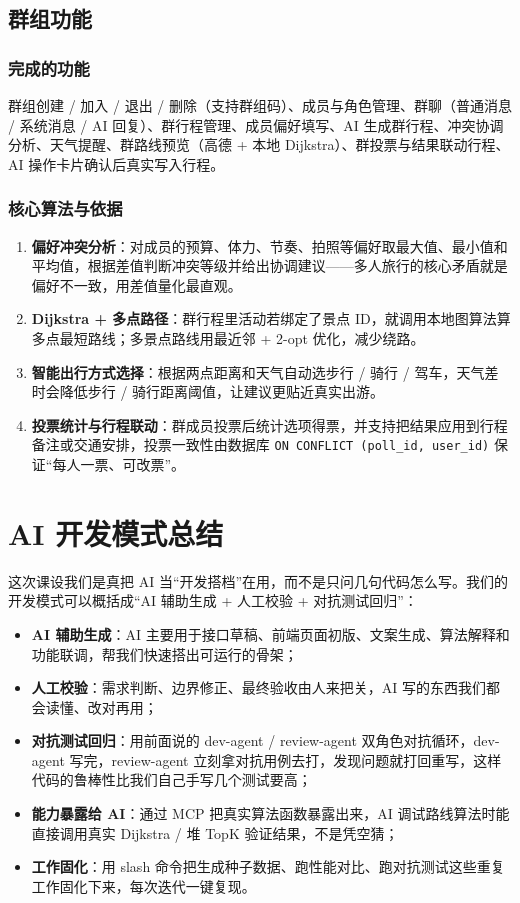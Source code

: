 \documentclass[UTF8,a4paper,12pt]{ctexart}
\begin{document}
\subsection{群组功能}

\subsubsection{完成的功能}
群组创建 / 加入 / 退出 / 删除（支持群组码）、成员与角色管理、群聊（普通消息 / 系统消息 / AI 回复）、群行程管理、成员偏好填写、AI 生成群行程、冲突协调分析、天气提醒、群路线预览（高德 + 本地 Dijkstra）、群投票与结果联动行程、AI 操作卡片确认后真实写入行程。

\subsubsection{核心算法与依据}
\begin{enumerate}
\item \textbf{偏好冲突分析}：对成员的预算、体力、节奏、拍照等偏好取最大值、最小值和平均值，根据差值判断冲突等级并给出协调建议——多人旅行的核心矛盾就是偏好不一致，用差值量化最直观。
\item \textbf{Dijkstra + 多点路径}：群行程里活动若绑定了景点 ID，就调用本地图算法算多点最短路线；多景点路线用最近邻 + 2-opt 优化，减少绕路。
\item \textbf{智能出行方式选择}：根据两点距离和天气自动选步行 / 骑行 / 驾车，天气差时会降低步行 / 骑行距离阈值，让建议更贴近真实出游。
\item \textbf{投票统计与行程联动}：群成员投票后统计选项得票，并支持把结果应用到行程备注或交通安排，投票一致性由数据库 \texttt{ON CONFLICT (poll\_id, user\_id)} 保证“每人一票、可改票”。
\end{enumerate}

\section{AI 开发模式总结}

这次课设我们是真把 AI 当“开发搭档”在用，而不是只问几句代码怎么写。我们的开发模式可以概括成“AI 辅助生成 + 人工校验 + 对抗测试回归”：

\begin{itemize}
\item \textbf{AI 辅助生成}：AI 主要用于接口草稿、前端页面初版、文案生成、算法解释和功能联调，帮我们快速搭出可运行的骨架；
\item \textbf{人工校验}：需求判断、边界修正、最终验收由人来把关，AI 写的东西我们都会读懂、改对再用；
\item \textbf{对抗测试回归}：用前面说的 dev-agent / review-agent 双角色对抗循环，dev-agent 写完，review-agent 立刻拿对抗用例去打，发现问题就打回重写，这样代码的鲁棒性比我们自己手写几个测试要高；
\item \textbf{能力暴露给 AI}：通过 MCP 把真实算法函数暴露出来，AI 调试路线算法时能直接调用真实 Dijkstra / 堆 TopK 验证结果，不是凭空猜；
\item \textbf{工作固化}：用 slash 命令把生成种子数据、跑性能对比、跑对抗测试这些重复工作固化下来，每次迭代一键复现。
\end{itemize}
\end{document}
